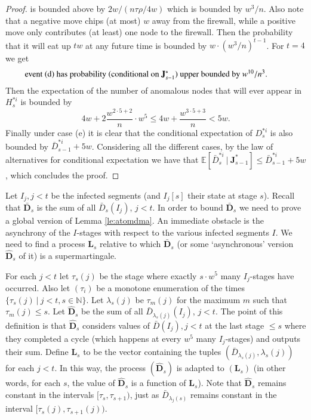 \documentclass[11pt]{article}
\theoremstyle{plain}
\numberwithin{equation}{subsection}
\newcommand{\Nat}{\mathbb{N}}
\newcommand{\DD}{\mathbf{D}}
\newcommand{\LL}{\mathbf{L}}
\newcommand{\JJ}{\mathbf{J}}
\DeclareRobustCommand{\expec}[3][{\mbox{$\mathbb{E}$}}]{\ensuremath {#1}\left[ {#2} \ \big|\  {#3} \right]}
\begin{document}
\begin{proof}
is bounded above by $2w/(n\tau\rho/4w)$ which is bounded by $w^3/n$. Also note that a negative move
chips (at most) $w$ away from the firewall, while a positive move only contributes (at least) one node to 
the firewall. Then the probability that it will eat up $tw$ at any future time is bounded by 
$w\cdot (w^3/n)^{t-1}$. For $t=4$ we get
\begin{equation*}\label{eq:probbluefis}
\parbox{11cm}{event (d)  has probability (conditional on $\JJ^{\ast}_{s-1}$) upper bounded by $w^{10}/n^3$.} 
\end{equation*}
Then the expectation of the number of anomalous nodes that will ever appear in $H^{\ast i}_s$
is bounded by
\[
4w+ 2\frac{w^{2\cdot 5+2}}{n}\cdot w^5\leq 4w+\frac{w^{3\cdot 5+3}}{n}<5w.
\]
Finally under case (e) it is clear that the conditional expectation of
$D_{s}^{\ast i}$ is also bounded by $\bar{D}_{s-1}^{\ast i} +5w$. Considering all the different cases,
by the law of alternatives for conditional expectation we have that
$\expec{\bar{D}_{s}^{\ast i}}{\JJ^{\ast}_{s-1}}\leq \bar{D}_{s-1}^{\ast i} +5w$, which concludes the proof.
\end{proof}
Let $I_j, j<t$ be the infected segments (and $I_j[s]$ their state at stage $s$). 
Recall that $\bar{\DD}_s$ is the sum of all $\bar{D}_{s}(I_j)$, $j<t$.
In order to bound $\bar{\DD}_s$  we need to prove a global version of Lemma \ref{le:atomdma}.
An immediate obstacle is the asynchrony of the $I$-stages with respect to the various infected segments $I$.
We need to find a process $\LL_s$ relative to which $\bar{\DD}_s$ 
(or some `asynchronous' version $\hat{\DD}_s$ of it) is a supermartingale.

For each $j<t$ let $\tau_s(j)$ be the
stage where exactly $s\cdot w^5$ many $I_j$-stages have occurred. 
Also let $(\tau_i)$ be a monotone enumeration of the times $\{\tau_s(j)\ |\ j<t, s\in\Nat\}$.
Let $\lambda_s(j)$ 
be $\tau_m(j)$ for the maximum $m$ such that
$\tau_m(j)\leq s$.
Let $\hat{\DD}_s$ be the sum of all $\bar{D}_{\lambda_s(j)}(I_j)$, $j<t$.
The point of this definition is that $\hat{\DD}_s$ considers values of $\bar{D}(I_j), j<t$ at the last stage 
$\leq s$ where 
they completed a cycle (which happens at every $w^5$ many $I_j$-stages) and outputs their sum.
Define $\LL_s$ to be the vector containing the tuples 
$(\bar{D}_{\lambda_s(j)}, \lambda_s(j))$ for each $j<t$.
In this way,  the process $(\hat{\DD}_s)$ is adapted to $(\LL_s)$ (in other words, for each $s$, the value of 
$\hat{\DD}_s$ is a function of $\LL_s$).
Note that $\hat{\DD}_s$ remains constant in the intervals $[\tau_s, \tau_{s+1})$, just as
$\bar{D}_{\lambda_j(s)}$ remains constant in the interval $[\tau_s(j), \tau_{s+1}(j))$.
\end{document}
